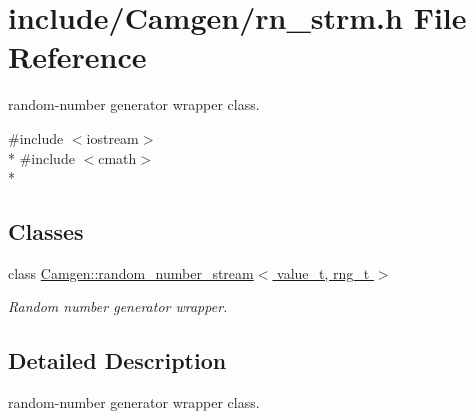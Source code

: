 \hypertarget{a00759}{}\section{include/\+Camgen/rn\+\_\+strm.h File Reference}
\label{a00759}


random-\/number generator wrapper class.  


{\ttfamily \#include $<$iostream$>$}\\*
{\ttfamily \#include $<$cmath$>$}\\*
\subsection*{Classes}
\begin{DoxyCompactItemize}
\item 
class \hyperlink{a00471}{Camgen\+::random\+\_\+number\+\_\+stream$<$ value\+\_\+t, rng\+\_\+t $>$}
\begin{DoxyCompactList}\small\item\em Random number generator wrapper. \end{DoxyCompactList}\end{DoxyCompactItemize}


\subsection{Detailed Description}
random-\/number generator wrapper class. 


